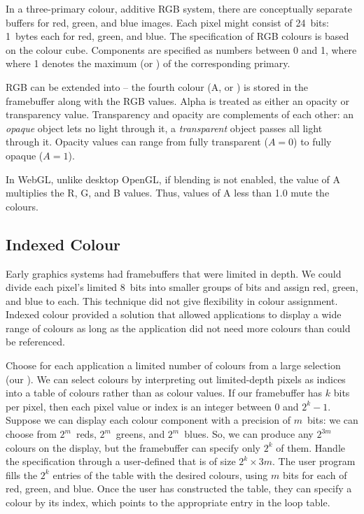 \documentclass[../notes.tex]{subfiles}
\begin{document}
        In a three-primary colour, additive RGB system, there are conceptually
        separate buffers for red, green, and blue images.
        Each pixel might consist of 24~bits: 1~bytes each for red, green, and blue.
        The specification of RGB colours is based on the colour cube.
        Components are specified as numbers between 0 and 1, where where 1 denotes the maximum
        (or ) of the corresponding primary.

        RGB can be extended into  -- the fourth colour (A, or )
        is stored in the framebuffer along with the RGB values.
        Alpha is treated as either an opacity or transparency value.
        Transparency and opacity are complements of each other:
        an \emph{opaque} object lets no light through it, a \emph{transparent} object
        passes all light through it.
        Opacity values can range from fully transparent ($A = 0$) to fully opaque ($A = 1$).

        In WebGL, unlike desktop OpenGL, if blending is not enabled,
        the value of A multiplies the R, G, and B values.
        Thus, values of A less than 1.0 mute the colours.

      \subsection{Indexed Colour}
        Early graphics systems had framebuffers that were limited in depth.
        We could divide each pixel's limited 8~bits into smaller groups of bits
        and assign red, green, and blue to each.
        This technique did not give flexibility in colour assignment.
        Indexed colour provided a solution that allowed applications to display a wide range
        of colours as long as the application did not need more colours than could be
        referenced.

        Choose for each application a limited number of colours from a large selection
        (our ).
        We can select colours by interpreting out limited-depth pixels as indices into a table
        of colours rather than as colour values.
        If our framebuffer has $k$ bits per pixel, then each pixel value or index is an integer
        between $0$ and $2^k - 1$.
        Suppose we can display each colour component with a precision of $m$~bits:
        we can choose from $2^m$~reds, $2^m$~greens, and $2^m$~blues.
        So, we can produce any $2^{3m}$ colours on the display,
        but the framebuffer can specify only $2^k$ of them.
        Handle the specification through a user-defined 
        that is of size $2^k \times 3m$.
        The user program fills the $2^k$ entries of the table with the desired colours,
        using $m$ bits for each of red, green, and blue.
        Once the user has constructed the table, they can specify a colour by its index,
        which points to the appropriate entry in the loop table.
\end{document}
